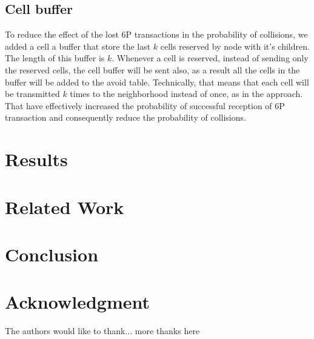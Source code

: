 \documentclass[10pt, conference, compsocconf]{IEEEtran}
\begin{document}
\subsection{Cell buffer}

To reduce the effect of the lost 6P transactions in the probability of collisions, we added a cell a buffer that store the last $k$ cells reserved by node with it's children. The length of this buffer is $k$.  Whenever a cell is reserved, instead of sending only the reserved cells, the cell buffer will be sent also, as a result all the cells in the buffer will be added to the avoid table. Technically, that means that each cell will be transmitted $k$ times to the neighborhood instead of once, as in the  approach. That have effectively increased the probability of successful reception of 6P transaction and consequently reduce the probability of collisions. 

     


 	
\section{Results}

\section{Related Work}

\section{Conclusion}



\section*{Acknowledgment}
The authors would like to thank...
more thanks here
\end{document}
